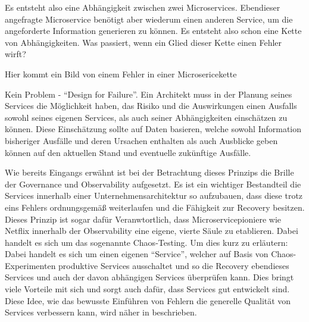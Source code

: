 Es entsteht also eine Abhängigkeit zwischen zwei Microservices. Ebendieser angefragte Microservice benötigt aber wiederum einen anderen Service, um die angeforderte Information generieren zu können. Es entsteht also schon eine Kette von Abhängigkeiten. Was passiert, wenn ein Glied dieser Kette einen Fehler wirft? 

\Large Hier kommt ein Bild von einem Fehler in einer Microsericekette

\normalsize

Kein Problem - \enquote{Design for Failure}. Ein Architekt muss in der Planung seines Services die Möglichkeit haben, das Risiko und die Auswirkungen einen Ausfalls sowohl seines eigenen Services, als auch seiner Abhängigkeiten einschätzen zu können. Diese Einschätzung sollte auf Daten basieren, welche sowohl Information bisheriger Ausfälle und deren Ursachen enthalten als auch Ausblicke geben können auf den aktuellen Stand und eventuelle zukünftige Ausfälle.

Wie bereits Eingangs erwähnt ist bei der Betrachtung dieses Prinzips die Brille der Governance und Observability aufgesetzt. Es ist ein wichtiger Bestandteil die Services innerhalb einer Unternehmensarchitektur so aufzubauen, dass diese trotz eins Fehlers ordnungsgemäß weiterlaufen und die Fähigkeit zur Recovery besitzen. Dieses Prinzip ist sogar dafür Veranwtortlich, dass Microservicepioniere wie Netflix innerhalb der Observability eine eigene, vierte Säule zu etablieren. Dabei handelt es sich um das sogenannte Chaos-Testing. Um dies kurz zu erläutern: Dabei handelt es sich um einen eigenen \enquote{Service}, welcher auf Basis von Chaos-Experimenten produktive Services ausschaltet und so die Recovery ebendieses Services und auch der davon abhängigen Services überprüfen kann. Dies bringt viele Vorteile mit sich und sorgt auch dafür, dass Services gut entwickelt sind. Diese Idee, wie das bewusste Einführen von Fehlern die generelle Qualität von Services verbessern kann, wird näher in \autocite{AntifragileOrganization} beschrieben.
